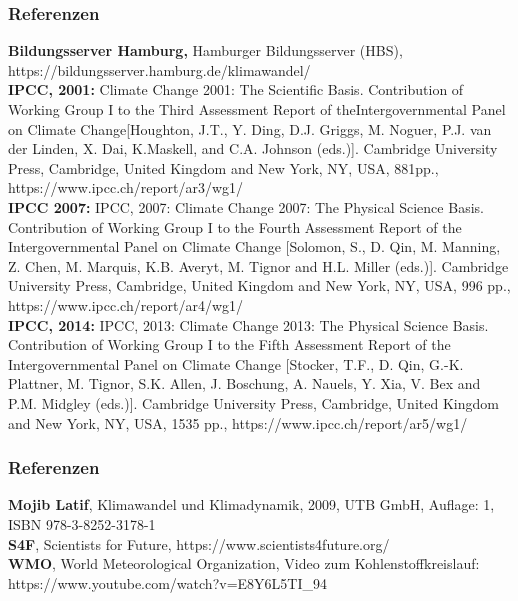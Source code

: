 \begin{frame}
	\frametitle{Referenzen}
	\small{
	\textbf{Bildungsserver Hamburg,} Hamburger Bildungsserver (HBS), https://bildungsserver.hamburg.de/klimawandel/ \\

	\textbf{IPCC, 2001:} Climate Change 2001: The Scientific Basis. Contribution of Working Group I to the Third Assessment Report of theIntergovernmental Panel on Climate Change[Houghton, J.T., Y. Ding, D.J. Griggs, M. Noguer, P.J. van der Linden, X. Dai, K.Maskell, and C.A. Johnson (eds.)]. Cambridge University Press, Cambridge, United Kingdom and New York, NY, USA, 881pp., https://www.ipcc.ch/report/ar3/wg1/\\

	\textbf{IPCC 2007:} IPCC, 2007: Climate Change 2007: The Physical Science Basis. Contribution of Working Group I to the Fourth Assessment Report of the Intergovernmental Panel on Climate Change [Solomon, S., D. Qin, M. Manning, Z. Chen, M. Marquis, K.B. Averyt, M. Tignor and H.L. Miller (eds.)]. Cambridge University Press, Cambridge, United Kingdom and New York, NY, USA, 996 pp.,  https://www.ipcc.ch/report/ar4/wg1/\\

	\textbf{IPCC, 2014:} IPCC, 2013: Climate Change 2013: The Physical Science Basis. Contribution of Working Group I to the Fifth Assessment Report of the Intergovernmental Panel on Climate Change [Stocker, T.F., D. Qin, G.-K. Plattner, M. Tignor, S.K. Allen, J. Boschung, A. Nauels, Y. Xia, V. Bex and P.M. Midgley (eds.)]. Cambridge University Press, Cambridge, United Kingdom and New York, NY, USA, 1535 pp., https://www.ipcc.ch/report/ar5/wg1/\\

	}
\end{frame}

\begin{frame}
	\frametitle{Referenzen}
	\small{
	\textbf{Mojib Latif}, Klimawandel und Klimadynamik, 2009, UTB GmbH, Auflage: 1, ISBN 978-3-8252-3178-1\\
	\textbf{S4F}, Scientists for Future, https://www.scientists4future.org/\\
	\textbf{WMO}, World Meteorological Organization, Video zum Kohlenstoffkreislauf: https://www.youtube.com/watch?v=E8Y6L5TI\_94
	}
\end{frame}
